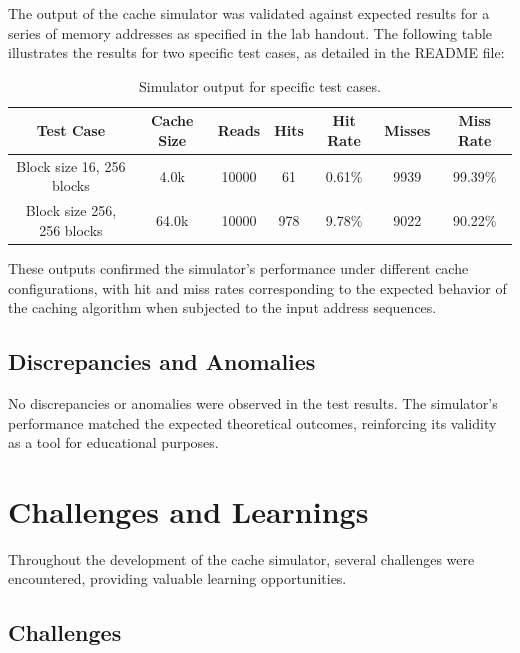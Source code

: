\documentclass[12pt]{article}
\begin{document}
The output of the cache simulator was validated against expected results for a series of memory addresses as specified in the lab handout. The following table illustrates the results for two specific test cases, as detailed in the README file:

\begin{table}[h!]
    \centering
    \begin{tabular}{|c|c|c|c|c|c|c|}
        \hline
        \textbf{Test Case}         & \textbf{Cache Size} & \textbf{Reads} & \textbf{Hits} & \textbf{Hit Rate} & \textbf{Misses} & \textbf{Miss Rate} \\ \hline
        Block size 16, 256 blocks  & 4.0k                & 10000          & 61            & 0.61\%            & 9939            & 99.39\%            \\ \hline
        Block size 256, 256 blocks & 64.0k               & 10000          & 978           & 9.78\%            & 9022            & 90.22\%            \\ \hline
    \end{tabular}
    \caption{Simulator output for specific test cases.}
    \label{tab:simulator_output}
\end{table}

These outputs confirmed the simulator's performance under different cache configurations, with hit and miss rates corresponding to the expected behavior of the caching algorithm when subjected to the input address sequences.

\subsection{Discrepancies and Anomalies}

No discrepancies or anomalies were observed in the test results. The simulator's performance matched the expected theoretical outcomes, reinforcing its validity as a tool for educational purposes.

\section{Challenges and Learnings}

Throughout the development of the cache simulator, several challenges were encountered, providing valuable learning opportunities.

\subsection{Challenges}
\end{document}
